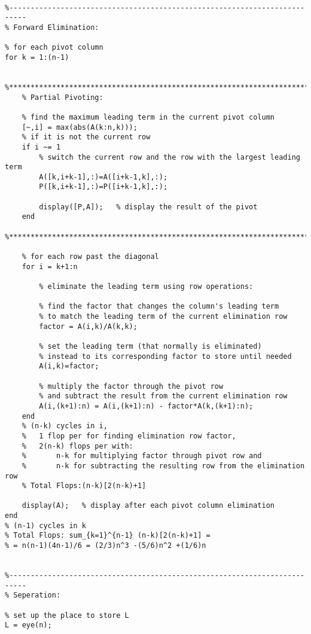 \documentclass{article}
\begin{document}
\begin{solution}
\begin{lstlisting}

%--------------------------------------------------------------------------
% Forward Elimination:

% for each pivot column
for k = 1:(n-1)
    
    %**********************************************************************
    % Partial Pivoting:
    
    % find the maximum leading term in the current pivot column
    [~,i] = max(abs(A(k:n,k)));
    % if it is not the current row
    if i ~= 1
        % switch the current row and the row with the largest leading term 
        A([k,i+k-1],:)=A([i+k-1,k],:);
        P([k,i+k-1],:)=P([i+k-1,k],:);
        
        display([P,A]);   % display the result of the pivot
    end    
    %**********************************************************************
    
    % for each row past the diagonal 
    for i = k+1:n
        
        % eliminate the leading term using row operations:
        
        % find the factor that changes the column's leading term
        % to match the leading term of the current elimination row
        factor = A(i,k)/A(k,k);
        
        % set the leading term (that normally is eliminated)
        % instead to its corresponding factor to store until needed
        A(i,k)=factor;
        
        % multiply the factor through the pivot row
        % and subtract the result from the current elimination row
        A(i,(k+1):n) = A(i,(k+1):n) - factor*A(k,(k+1):n);
    end
    % (n-k) cycles in i,
    %   1 flop per for finding elimination row factor, 
    %   2(n-k) flops per with:
    %       n-k for multiplying factor through pivot row and
    %       n-k for subtracting the resulting row from the elimination row
    % Total Flops:(n-k)[2(n-k)+1]
    
    display(A);   % display after each pivot column elimination
end
% (n-1) cycles in k
% Total Flops: sum_{k=1}^{n-1} (n-k)[2(n-k)+1] = 
% = n(n-1)(4n-1)/6 = (2/3)n^3 -(5/6)n^2 +(1/6)n


%--------------------------------------------------------------------------
% Seperation:

% set up the place to store L
L = eye(n);


\end{lstlisting}
\end{solution}
\end{document}
